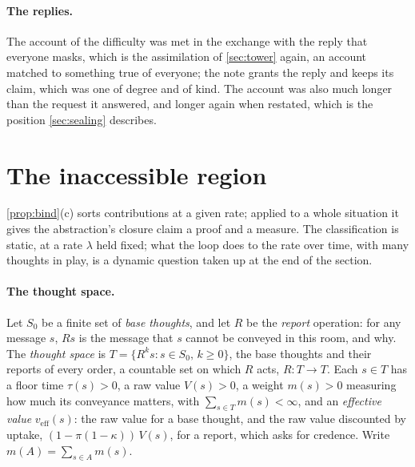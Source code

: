 \paragraph{The replies.} The account of the difficulty was met in the exchange with the reply that everyone masks, which is the assimilation of \autoref{sec:tower} again, an account matched to something true of everyone; the note grants the reply and keeps its claim, which was one of degree and of kind. The account was also much longer than the request it answered, and longer again when restated, which is the position \autoref{sec:sealing} describes.

\section{The inaccessible region}\label{sec:fixedpoint}

\autoref{prop:bind}(c) sorts contributions at a given rate; applied to a whole situation it gives the abstraction's closure claim a proof and a measure. The classification is static, at a rate $\lambda$ held fixed; what the loop does to the rate over time, with many thoughts in play, is a dynamic question taken up at the end of the section.

\paragraph{The thought space.} Let $S_0$ be a finite set of \emph{base thoughts}, and let $R$ be the \emph{report} operation: for any message $s$, $Rs$ is the message that $s$ cannot be conveyed in this room, and why. The \emph{thought space} is $T = \{R^k s : s \in S_0,\, k \ge 0\}$, the base thoughts and their reports of every order, a countable set on which $R$ acts, $R: T \to T$. Each $s \in T$ has a floor time $\tau(s) > 0$, a raw value $V(s) > 0$, a weight $m(s) > 0$ measuring how much its conveyance matters, with $\sum_{s \in T} m(s) < \infty$, and an \emph{effective value} $v_{\mathrm{eff}}(s)$: the raw value for a base thought, and the raw value discounted by uptake, $(1 - \pi(1-\kappa))\,V(s)$, for a report, which asks for credence. Write $m(A) = \sum_{s \in A} m(s)$.


